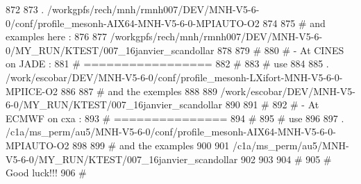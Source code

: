  872 
 873 . /workgpfs/rech/mnh/rmnh007/DEV/MNH-V5-6-0/conf/profile_mesonh-AIX64-MNH-V5-6-0-MPIAUTO-O2
 874 
 875 # and examples here :
 876 
 877 /workgpfs/rech/mnh/rmnh007/DEV/MNH-V5-6-0/MY_RUN/KTEST/007_16janvier_scandollar
 878 
 879 # 
 880 #  - At CINES on JADE :
 881 #    =================
 882 #
 883 # use 
 884 
 885 . /work/escobar/DEV/MNH-V5-6-0/conf/profile_mesonh-LXifort-MNH-V5-6-0-MPIICE-O2
 886 
 887 # and the exemples
 888 
 889 /work/escobar/DEV/MNH-V5-6-0/MY_RUN/KTEST/007_16janvier_scandollar
 890 
 891 #
 892 #  - At ECMWF on cxa :
 893 #    ===============
 894 #
 895 # use
 896 
 897 . /c1a/ms_perm/au5/MNH-V5-6-0/conf/profile_mesonh-AIX64-MNH-V5-6-0-MPIAUTO-O2
 898 
 899 # and the examples
 900 
 901 /c1a/ms_perm/au5/MNH-V5-6-0/MY_RUN/KTEST/007_16janvier_scandollar
 902 
 903 
 904 #
 905 #  Good luck!!!
 906 #